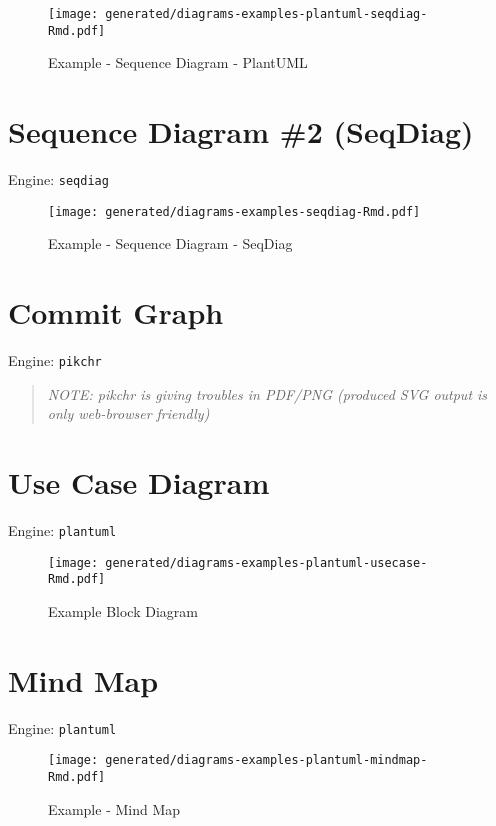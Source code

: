 \documentclass[12pt,a4paper,12pt,oneside,openany]{book}
\begin{document}
\begin{figure}
\centering
\texttt{[image: generated/diagrams-examples-plantuml-seqdiag-Rmd.pdf]}
\caption{Example - Sequence Diagram - PlantUML}
\end{figure}

\newpage

\section{Sequence Diagram \#2 (SeqDiag)}\label{sequence-diagram-2-seqdiag}

Engine: \texttt{seqdiag}

\begin{figure}
\centering
\texttt{[image: generated/diagrams-examples-seqdiag-Rmd.pdf]}
\caption{Example - Sequence Diagram - SeqDiag}
\end{figure}

\newpage

\section{Commit Graph}\label{commit-graph}

Engine: \texttt{pikchr}

\begin{quote}
\emph{NOTE: pikchr is giving troubles in PDF/PNG (produced SVG output is only web-browser friendly)}
\end{quote}

\newpage

\section{Use Case Diagram}\label{use-case-diagram}

Engine: \texttt{plantuml}

\begin{figure}
\centering
\texttt{[image: generated/diagrams-examples-plantuml-usecase-Rmd.pdf]}
\caption{Example Block Diagram}
\end{figure}

\newpage

\section{Mind Map}\label{mind-map}

Engine: \texttt{plantuml}

\begin{figure}
\centering
\texttt{[image: generated/diagrams-examples-plantuml-mindmap-Rmd.pdf]}
\caption{Example - Mind Map}
\end{figure}
\end{document}
